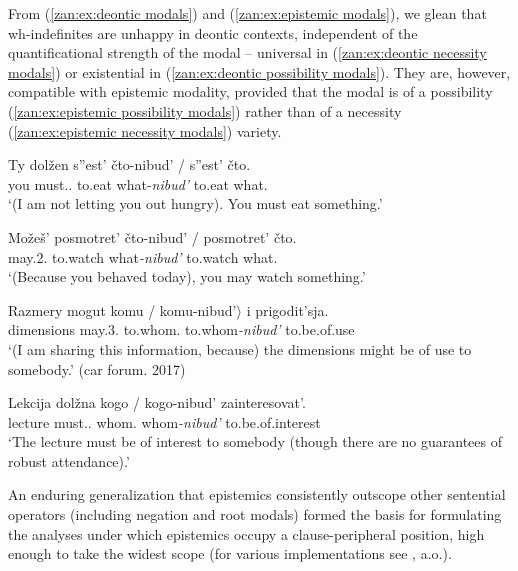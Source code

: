 \documentclass[output=paper,colorlinks,citecolor=brown]{langscibook}
\begin{document}
\noindent From (\ref{zan:ex:deontic modals}) and (\ref{zan:ex:epistemic modals}), we glean that wh-indefinites are unhappy in deontic contexts, independent of the quantificational strength of the modal -- universal in (\ref{zan:ex:deontic necessity modals}) or existential in (\ref{zan:ex:deontic possibility modals}). They are, however, compatible with epistemic modality, provided that the modal is of a possibility (\ref{zan:ex:epistemic possibility modals}) rather than of a necessity (\ref{zan:ex:epistemic necessity modals}) variety. 


\ea \label{zan:ex:deontic modals}
\ea \label{zan:ex:deontic necessity modals}
        \gll Ty dolžen s''est'  čto-nibud' / \minsp{*} s''est' čto.\\
        you must.{\MASC.\SG} to.eat  what-\textit{nibud'} {} {} to.eat what.{\INDF} \\
        \glt  `(I am not letting you out hungry). You must eat something.'

\ex \label{zan:ex:deontic possibility modals}
        \gll Možeš’ posmotret’ čto-nibud’ /  posmotret' čto. \\
        may.2.{\SG} to.watch what\textit{-nibud'}  {} {} to.watch what.{\INDF} \\
        \glt  `(Because you behaved today), you may watch something.'
\z \z


\ea \label{zan:ex:epistemic modals}
\ea \label{zan:ex:epistemic possibility modals}
        \gll Razmery mogut komu / \minsp{$\langle$} komu-nibud'$\rangle$ i prigodit’sja.\\
        dimensions may.{3.\PL} to.whom.{\INDF}  {} {} to.whom\textit{-nibud'} {\FOC} to.be.of.use \\
        \glt  `(I am sharing this information, because) the dimensions might be of use to somebody.' \hfill {(car forum. 2017)}
       
\ex \label{zan:ex:epistemic necessity modals}
        \gll Lekcija dolžna  kogo / kogo-nibud' zainteresovat'.\\
        lecture must.{\FEM.\SG} {} whom.{\INDF} {} whom\textit{-nibud'} to.be.of.interest \\
        \glt  `The lecture must be of interest to somebody (though there are no guarantees of robust attendance).'\\
\z\z

\noindent An enduring generalization that epistemics consistently outscope other sentential operators (including negation and root modals) formed the basis for formulating the analyses under which epistemics occupy a clause-peripheral position, high enough to take the widest scope (for various implementations see \citealt{butler2003minimalist, drubig2001syntactic, cormack2002modals}, a.o.). 
\end{document}
